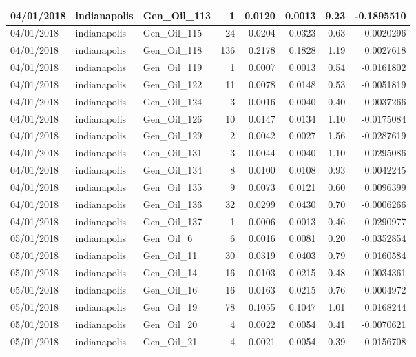 \documentclass[
  letterpaper,
  DIV=11,
  numbers=noendperiod]{scrartcl}
\begin{document}
\begin{tabular}{l|l|l|r|r|r|r|r}
\hline
04/01/2018 & indianapolis & Gen\_Oil\_113 & 1 & 0.0120 & 0.0013 & 9.23 & -0.1895510\\
\hline
04/01/2018 & indianapolis & Gen\_Oil\_115 & 24 & 0.0204 & 0.0323 & 0.63 & 0.0020296\\
\hline
04/01/2018 & indianapolis & Gen\_Oil\_118 & 136 & 0.2178 & 0.1828 & 1.19 & 0.0027618\\
\hline
04/01/2018 & indianapolis & Gen\_Oil\_119 & 1 & 0.0007 & 0.0013 & 0.54 & -0.0161802\\
\hline
04/01/2018 & indianapolis & Gen\_Oil\_122 & 11 & 0.0078 & 0.0148 & 0.53 & -0.0051819\\
\hline
04/01/2018 & indianapolis & Gen\_Oil\_124 & 3 & 0.0016 & 0.0040 & 0.40 & -0.0037266\\
\hline
04/01/2018 & indianapolis & Gen\_Oil\_126 & 10 & 0.0147 & 0.0134 & 1.10 & -0.0175084\\
\hline
04/01/2018 & indianapolis & Gen\_Oil\_129 & 2 & 0.0042 & 0.0027 & 1.56 & -0.0287619\\
\hline
04/01/2018 & indianapolis & Gen\_Oil\_131 & 3 & 0.0044 & 0.0040 & 1.10 & -0.0295086\\
\hline
04/01/2018 & indianapolis & Gen\_Oil\_134 & 8 & 0.0100 & 0.0108 & 0.93 & 0.0042245\\
\hline
04/01/2018 & indianapolis & Gen\_Oil\_135 & 9 & 0.0073 & 0.0121 & 0.60 & 0.0096399\\
\hline
04/01/2018 & indianapolis & Gen\_Oil\_136 & 32 & 0.0299 & 0.0430 & 0.70 & -0.0006266\\
\hline
04/01/2018 & indianapolis & Gen\_Oil\_137 & 1 & 0.0006 & 0.0013 & 0.46 & -0.0290977\\
\hline
05/01/2018 & indianapolis & Gen\_Oil\_6 & 6 & 0.0016 & 0.0081 & 0.20 & -0.0352854\\
\hline
05/01/2018 & indianapolis & Gen\_Oil\_11 & 30 & 0.0319 & 0.0403 & 0.79 & 0.0160584\\
\hline
05/01/2018 & indianapolis & Gen\_Oil\_14 & 16 & 0.0103 & 0.0215 & 0.48 & 0.0034361\\
\hline
05/01/2018 & indianapolis & Gen\_Oil\_16 & 16 & 0.0163 & 0.0215 & 0.76 & 0.0004972\\
\hline
05/01/2018 & indianapolis & Gen\_Oil\_19 & 78 & 0.1055 & 0.1047 & 1.01 & 0.0168244\\
\hline
05/01/2018 & indianapolis & Gen\_Oil\_20 & 4 & 0.0022 & 0.0054 & 0.41 & -0.0070621\\
\hline
05/01/2018 & indianapolis & Gen\_Oil\_21 & 4 & 0.0021 & 0.0054 & 0.39 & -0.0156708\\

\end{tabular}
\end{document}
